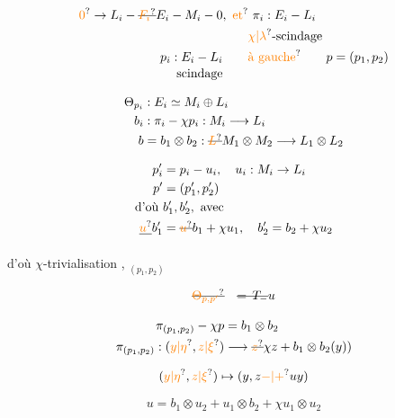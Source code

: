 
\[
\begin{aligned}
\unsure{0}\to L_i - \deleted{\unsure{F_i}}E_i - M_i - 0
 &,\ \unsure{\text{et}}\ \pi_i:E_i-L_i\\
 &\qquad\unsure{\chi|\lambda}\text{-scindage}\\
p_i:E_i-L_i &\qquad\unsure{\text{à gauche}}\qquad p=(p_1,p_2)\\[-2pt]
\text{scindage}&
\end{aligned}
\]

\[
\begin{aligned}
\Theta_{p_i}&:E_i\simeq M_i\oplus L_i\\
b_i&:\pi_i-\chi p_i:M_i\longrightarrow L_i\\
b&=b_1\otimes b_2:\deleted{\unsure{L}}M_1\otimes M_2\longrightarrow L_1\otimes L_2
\end{aligned}
\]

\[
\begin{aligned}
p'_i&=p_i-u_i,\quad u_i:M_i\to L_i\\
p'&=(p'_1,p'_2)\\
\text{d'où }&b'_1,b'_2,\ \text{avec}\\
\deleted{\unsure{u}}b'_1&=\deleted{\unsure{u}}b_1+\chi u_1,\quad b'_2=b_2+\chi u_2
\end{aligned}
\]

d'où $\chi$-trivialisation , $_{(p_1,p_2)}$


\[
\deleted{\unsure{\Theta_{p,p'}}}\quad\deleted{={}\,T_{-}}u
\]

\[
\begin{aligned}
\pi_{(p_1,p_2)}-\chi p&=b_1\otimes b_2\\
\pi_{(p_1,p_2)}:(\unsure{y|\eta},\unsure{z|\xi})&\longrightarrow
 \deleted{\unsure{z}}\chi z+b_1\otimes b_2(y))
\end{aligned}
\]

\[
(\unsure{y|\eta},\unsure{z|\xi})\mapsto(y,z\unsure{-|+}uy)
\]

\[
u=b_1\otimes u_2+u_1\otimes b_2+\chi u_1\otimes u_2
\]


